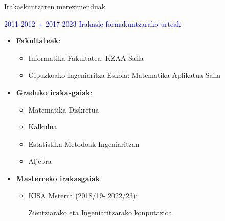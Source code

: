 \documentclass[
 10pt,%
 compress,%
 t,       %
 xcolor=svgnames
]{beamer}
\theoremstyle{definition} \newtheorem{definicion}{Definicion}[section]
\theoremstyle{propiedades} \newtheorem{propiedades}{Propiedades}[section]
\begin{document}
\begin{frame}{Irakaskuntzaren merezimenduak} 

\medskip
\hspace*{3.cm} \textcolor{blue}{2011-2012 +  2017-2023}
\hspace*{2.7cm} \textcolor{blue}{Irakasle formakuntzarako urteak}

\medskip

\begin{itemize}
	
	
\item \textbf{Fakultateak}:

\begin{itemize}
\item Informatika Fakultatea: KZAA Saila 
\item Gipuzkoako Ingeniaritza Eskola: Matematika Aplikatua Saila
\end{itemize}

\medskip

\item \textbf{Graduko irakasgaiak}:

\begin{itemize}
\item Matematika Diskretua
\item Kalkulua
\item Estatistika Metodoak Ingeniaritzan
\item Aljebra

\end{itemize}

\medskip

\item \textbf{Masterreko irakasgaiak} %

\begin{itemize}
\item KISA Msterra (2018/19- 2022/23):
 
      Zientziarako eta Ingeniaritzarako konputazioa %


\end{itemize}

\end{itemize}


\end{frame}
\end{document}
